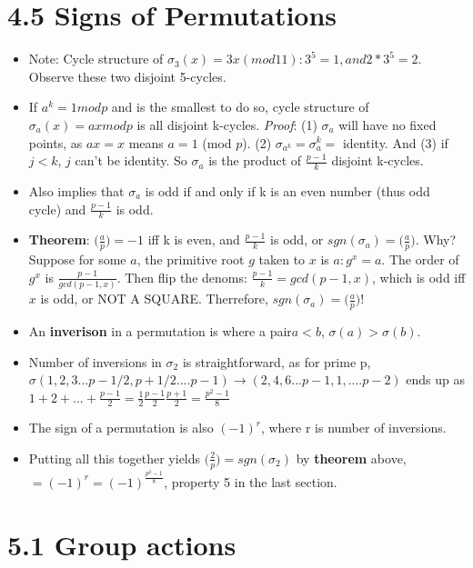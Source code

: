 \documentclass[11pt, oneside]{article}   	%
\begin{document}
\section{4.5 Signs of Permutations}
\begin{itemize}
\item Note: Cycle structure of $\sigma_3(x) = 3x (mod 11): 3^5 = 1, and 2*3^5=2$.  Observe these two disjoint 5-cycles.
\item If $a^k = 1 mod p$ and is the smallest to do so, cycle structure of $\sigma_a(x) = ax mod p$ is all disjoint k-cycles.  \emph{Proof}: (1) $\sigma_a$ will have no fixed points, as $ax = x$ means $a = 1$ (mod $p$).  (2) $\sigma_{a^k} = \sigma_a^k = $ identity.  And (3) if $j < k$, $j$ can't be identity.   So $\sigma_a$ is the product of $\frac{p-1}{k}$ disjoint k-cycles.
\item Also implies that $\sigma_a$ is odd if and only if k is an even number (thus odd cycle) and $\frac{p-1}{k}$ is odd.
\item \textbf{Theorem}: $\Big(\frac{a}{p}\Big)  = -1$ iff k is even, and $\frac{p-1}{k}$ is odd, or $sgn(\sigma_a) = \Big(\frac{a}{p}\Big)$. Why? Suppose for some $a$, the primitive root $g$ taken to $x$ is $a: g^x = a$.  The order of $g^x$ is $\frac{p-1}{gcd(p-1,x)}$.  Then flip the denoms: $\frac{p-1}{k} = gcd(p-1,x)$, which is odd iff $x$ is odd, or NOT A SQUARE.  Therrefore, $sgn(\sigma_a) = \Big(\frac{a}{p}\Big) $!
\item An \textbf{inverison} in a permutation is where a pair$a < b$, $\sigma(a) > \sigma(b)$.  
\item Number of inversions in $\sigma_2$ is straightforward, as for prime p, $\sigma(1, 2, 3 ... p-1/2, p+1/2 .... p-1) \rightarrow (2, 4, 6  ... p-1, 1, .... p-2)$ ends up as $ 1 + 2 + ... + \frac{p-1}{2} = \frac{1}{2} \frac{p-1}{2}\frac{p+1}{2} = \frac{p^2-1}{8}$
\item The sign of a permutation is also $(-1)^r$, where r is number of inversions.
\item Putting all this together yields $\Big(\frac{2}{p}\Big)  = sgn(\sigma_2)$ by \textbf{theorem} above, $ = (-1)^r = (-1)^\frac{p^2-1}{8}$, property 5 in the last section.
\end{itemize}



\section{5.1 Group actions}
\end{document}
